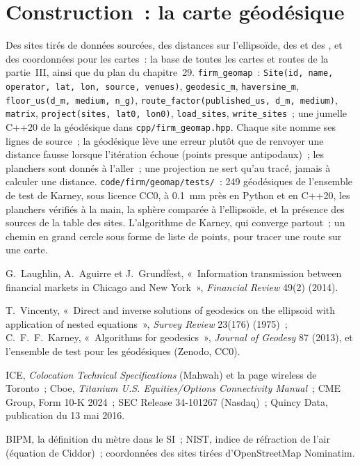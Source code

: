 \section{Construction~: la carte géodésique}\label{bld:nw:the-north-american-map:geomap}

\begin{build}
 Des sites tirés de données sourcées, des distances sur l'ellipsoïde, des  et des , et des coordonnées pour les cartes~: la base de
toutes les cartes et routes de la partie~III, ainsi que du plan du chapitre~29.
 \texttt{firm\_geomap}~: \texttt{Site(id, name, operator, lat, lon, source, venues)}, \texttt{geodesic\_m},
\texttt{haversine\_m}, \texttt{floor\_us(d\_m, medium, n\_g)}, \texttt{route\_factor(published\_us, d\_m, medium)}, \texttt{matrix},
\texttt{project(sites, lat0, lon0)}, \texttt{load\_sites}, \texttt{write\_sites}~; une jumelle C++20 de la géodésique dans \texttt{cpp/firm\_geomap.hpp}.
 Chaque site nomme ses lignes de source~; la géodésique lève une erreur plutôt que de renvoyer une distance fausse lorsque l'itération échoue (points
presque antipodaux)~; les planchers sont donnés à l'aller~; une projection ne sert qu'au tracé, jamais à calculer une distance.
 \texttt{code/firm/geomap/tests/}~: 249 géodésiques de l'ensemble de test de Karney, sous licence CC0, à 0.1~mm près en Python et en
C++20, les planchers vérifiés à la main, la sphère comparée à l'ellipsoïde, et la présence des sources de la table des sites.
 L'algorithme de Karney, qui converge partout~; un chemin en grand cercle sous forme de liste de points, pour tracer une route sur une carte.
\end{build}

\begin{omsources}
\item G.~Laughlin, A.~Aguirre et J.~Grundfest, «~Information transmission between financial markets in Chicago and New York~», \emph{Financial
Review} 49(2) (2014).
\item T.~Vincenty, «~Direct and inverse solutions of geodesics on the ellipsoid with application of nested equations~», \emph{Survey Review}
23(176) (1975)~; C.~F.~F.~Karney, «~Algorithms for geodesics~», \emph{Journal of Geodesy} 87 (2013), et l'ensemble de test pour les géodésiques (Zenodo, CC0).
\item ICE, \emph{Colocation Technical Specifications} (Mahwah) et la page wireless de Toronto~; Cboe, \emph{Titanium U.S. Equities/Options
Connectivity Manual}~; CME Group, Form 10-K 2024~; SEC Release 34-101267 (Nasdaq)~; Quincy Data, publication du 13 mai 2016.
\item BIPM, la définition du mètre dans le SI~; NIST, indice de réfraction de l'air (équation de Ciddor)~; coordonnées des sites tirées d'OpenStreetMap Nominatim.
\end{omsources}

